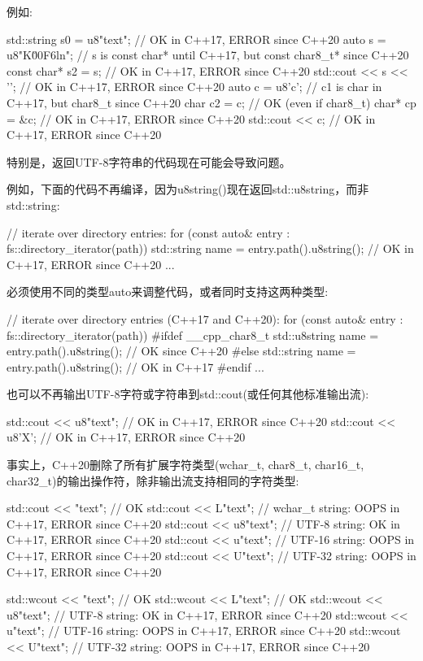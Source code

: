 
例如:

\begin{cpp}
std::string s0 = u8"text"; // OK in C++17, ERROR since C++20
auto s = u8"K\u00F6ln"; // s is const char* until C++17, but const char8_t* since C++20
const char* s2 = s; // OK in C++17, ERROR since C++20
std::cout << s << '\n'; // OK in C++17, ERROR since C++20
auto c = u8'c'; // c1 is char in C++17, but char8_t since C++20
char c2 = c; // OK (even if char8_t)
char* cp = &c; // OK in C++17, ERROR since C++20
std::cout << c; // OK in C++17, ERROR since C++20
\end{cpp}



特别是，返回UTF-8字符串的代码现在可能会导致问题。

例如，下面的代码不再编译，因为u8string()现在返回std::u8string，而非std::string:

\begin{cpp}
// iterate over directory entries:
for (const auto& entry : fs::directory_iterator(path)) {
	std::string name = entry.path().u8string(); // OK in C++17, ERROR since C++20
	...
}
\end{cpp}

必须使用不同的类型auto来调整代码，或者同时支持这两种类型:

\begin{cpp}
// iterate over directory entries (C++17 and C++20):
for (const auto& entry : fs::directory_iterator(path)) {
#ifdef __cpp_char8_t
	std::u8string name = entry.path().u8string(); // OK since C++20
#else
	std::string name = entry.path().u8string(); // OK in C++17
#endif
	...
}
\end{cpp}


也可以不再输出UTF-8字符或字符串到std::cout(或任何其他标准输出流):

\begin{cpp}
std::cout << u8"text"; // OK in C++17, ERROR since C++20
std::cout << u8'X'; // OK in C++17, ERROR since C++20
\end{cpp}

事实上，C++20删除了所有扩展字符类型(wchar\_t, char8\_t, char16\_t, char32\_t)的输出操作符，除非输出流支持相同的字符类型:

\begin{cpp}
std::cout << "text"; // OK
std::cout << L"text"; // wchar_t string: OOPS in C++17, ERROR since C++20
std::cout << u8"text"; // UTF-8 string: OK in C++17, ERROR since C++20
std::cout << u"text"; // UTF-16 string: OOPS in C++17, ERROR since C++20
std::cout << U"text"; // UTF-32 string: OOPS in C++17, ERROR since C++20

std::wcout << "text"; // OK
std::wcout << L"text"; // OK
std::wcout << u8"text"; // UTF-8 string: OK in C++17, ERROR since C++20
std::wcout << u"text"; // UTF-16 string: OOPS in C++17, ERROR since C++20
std::wcout << U"text"; // UTF-32 string: OOPS in C++17, ERROR since C++20
\end{cpp}


